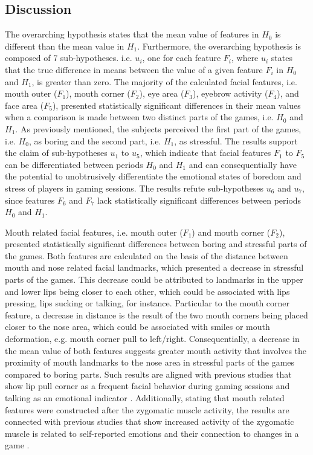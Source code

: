 \subsection{Discussion}

The overarching hypothesis states that the mean value of features in $H_0$ is different than the mean value in $H_1$. Furthermore, the overarching hypothesis is composed of 7 sub-hypotheses. i.e. $u_i$, one for each feature $F_i$, where $u_i$ states that the true difference in means between the value of a given feature $F_i$ in $H_0$ and $H_1$, is greater than zero. The majority of the calculated facial features, i.e. mouth outer ($F_1$), mouth corner ($F_2$), eye area ($F_3$), eyebrow activity ($F_4$), and face area ($F_5$), presented statistically significant differences in their mean values when a comparison is made between two distinct parts of the games, i.e. $H_0$ and $H_1$. As previously mentioned, the subjects perceived the first part of the games, i.e. $H_0$, as boring and the second part, i.e. $H_1$, as stressful. The results support the claim of sub-hypotheses $u_1$ to $u_5$, which indicate that facial features $F_1$ to $F_5$ can be differentiated between periods $H_0$ and $H_1$ and can consequentially have the potential to unobtrusively differentiate the emotional states of boredom and stress of players in gaming sessions. The results refute sub-hypotheses $u_6$ and $u_7$, since features $F_6$ and $F_7$ lack statistically significant differences between periods $H_0$ and $H_1$.

Mouth related facial features, i.e. mouth outer ($F_1$) and mouth corner ($F_2$), presented statistically significant differences between boring and stressful parts of the games. Both features are calculated on the basis of the distance between mouth and nose related facial landmarks, which presented a decrease in stressful parts of the games. This decrease could be attributed to landmarks in the upper and lower lips being closer to each other, which could be associated with lips pressing, lips sucking or talking, for instance. Particular to the mouth corner feature, a decrease in distance is the result of the two mouth corners being placed closer to the nose area, which could be associated with smiles or mouth deformation, e.g. mouth corner pull to left/right. Consequentially, a decrease in the mean value of both features suggests greater mouth activity that involves the proximity of mouth landmarks to the nose area in stressful parts of the games compared to boring parts. Such results are aligned with previous studies that show lip pull corner as a frequent facial behavior during gaming sessions \parencite{kaiser1994multi} and talking as an emotional indicator \parencite{blom2014towards}. Additionally, stating that mouth related features were constructed after the zygomatic muscle activity, the results are connected with previous studies that show increased activity of the zygomatic muscle is related to self-reported emotions \parencite{tijs2008dynamic} and their connection to changes in a game \parencite{ravaja20051}.


